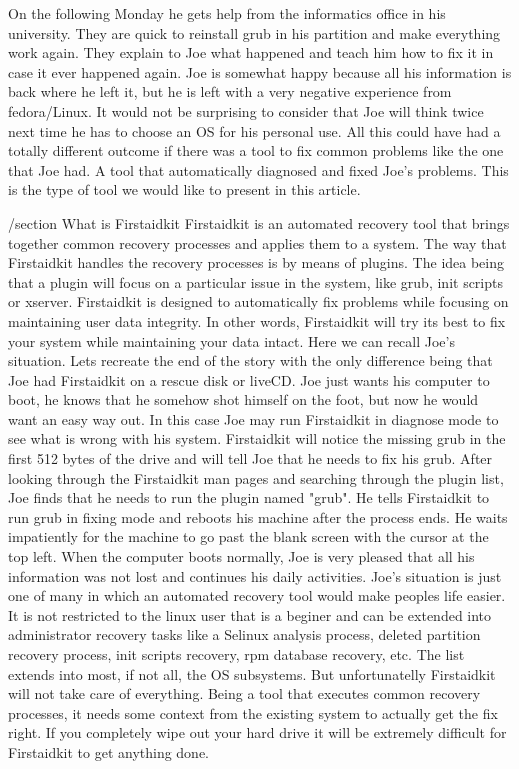On the following Monday he gets help from the informatics office in his university.  They are quick to reinstall grub in his partition and make everything work again.  They explain to Joe what happened and teach him how to fix it in case it ever happened again.  Joe is somewhat happy because all his information is back where he left it, but he is left with a very negative experience from fedora/Linux.  It would not be surprising to consider that Joe will think twice next time he has to choose an OS for his personal use.  All this could have had a totally different outcome if there was a tool to fix common problems like the one that Joe had.  A tool that automatically diagnosed and fixed Joe's problems.  This is the type of tool we would like to present in this article.

/section{ What is Firstaidkit }
Firstaidkit is an automated recovery tool that brings together common recovery processes and applies them to a system.  The way that Firstaidkit handles the recovery processes is by means of plugins.  The idea being that a plugin will focus on a particular issue in the system, like grub, init scripts or xserver.  Firstaidkit is designed to automatically fix problems while focusing on maintaining user data integrity.  In other words, Firstaidkit will try its best to fix your system while maintaining your data intact.
Here we can recall Joe's situation.  Lets recreate the end of the story with the only difference being that Joe had Firstaidkit on a rescue disk or liveCD.  Joe just wants his computer to boot, he knows that he somehow shot himself on the foot, but now he would want an easy way out.  In this case Joe may run Firstaidkit in diagnose mode to see what is wrong with his system.  Firstaidkit will notice the missing grub in the first 512 bytes of the drive and will tell Joe that he needs to fix his grub.  After looking through the Firstaidkit man pages and searching through the plugin list, Joe finds that he needs to run the plugin named "grub".  He tells Firstaidkit to run grub in fixing mode and reboots his machine after the process ends.  He waits impatiently for the machine to go past the blank screen with the cursor at the top left.  When the computer boots normally, Joe is very pleased that all his information was not lost and continues his daily activities.
Joe's situation is just one of many in which an automated recovery tool would make peoples life easier.  It is not restricted to the linux user that is a beginer and can be extended into administrator recovery tasks like a Selinux analysis process, deleted partition recovery process, init scripts recovery, rpm database recovery, etc.  The list extends into most, if not all, the OS subsystems.
But unfortunatelly Firstaidkit will not take care of everything.  Being a tool that executes common recovery processes, it needs some context from the existing system to actually get the fix right.  If you completely wipe out your hard drive it will be extremely difficult for Firstaidkit to get anything done.

